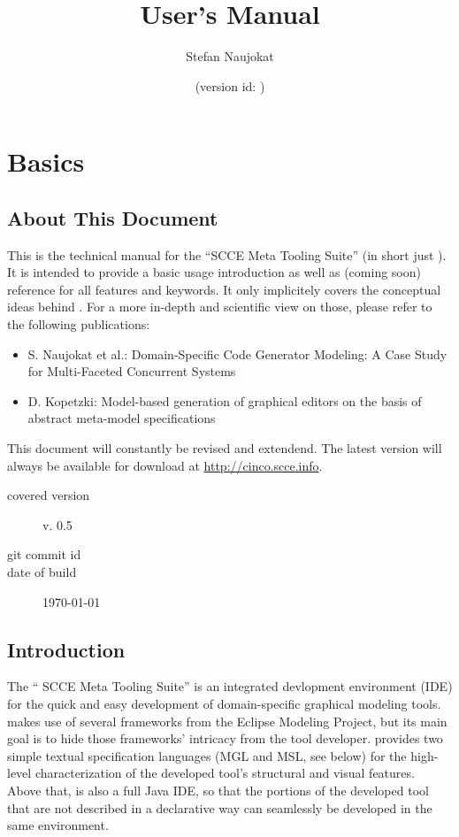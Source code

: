 \documentclass[a4paper,american,12pt]{scrreprt}
\begin{document}
\title{\cinco User's Manual}
\author{Stefan Naujokat}
\date{(version id: \gitAbbrevHash{})}
\maketitle

\chapter{Basics}

\section{About This Document}

This is the technical manual for the ``\cinco SCCE Meta Tooling Suite'' (in
short just \cinco). It is intended to provide a basic usage introduction as
well as (coming soon) reference for all features and keywords. It only implicitely covers the
conceptual ideas behind \cinco. For a more in-depth and scientific view on those,
please refer to the following publications:
%
\begin{itemize}
\item S. Naujokat et al.: Domain-Specific Code Generator Modeling: A Case Study for
Multi-Faceted Concurrent Systems \cite{NaTISL2014}
\item D. Kopetzki: Model-based generation of graphical editors on
the basis of abstract meta-model specifications \cite{Kopetz2014}
\end{itemize}

This document will constantly be revised and extendend. The latest version will
always be available for download at \url{http://cinco.scce.info}. 

\begin{description}
\item[covered version] \cinco v. 0.5
\item[git commit id] \gitAbbrevHash{}
\item[date of build] \today
\end{description}

\section{Introduction}

The ``\cinco{} SCCE Meta Tooling Suite'' is an integrated devlopment environment
(IDE) for the quick and easy development of domain-specific graphical modeling
tools. \cinco{} makes use of several frameworks from the Eclipse Modeling
Project, but its main goal is to hide those frameworks' intricacy from the
tool developer. \cinco{} provides two simple textual specification languages (MGL and
MSL, see below) for the high-level characterization of the developed tool's
structural and visual features. Above that, \cinco{} is also a full Java IDE, so
that the portions of the developed tool that are not described in a declarative
way can seamlessly be developed in the same environment.
\end{document}
